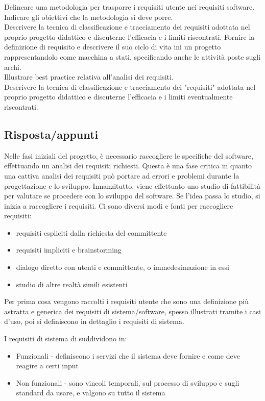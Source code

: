 Delineare una metodologia per trasporre i requisiti utente nei requisiti software. 
Indicare gli obiettivi che la metodologia si deve porre.\\

Descrivere la tecnica di classificazione e tracciamento dei requisiti adottata nel proprio progetto didattico e discuterne l'efficacia e i limiti riscontrati.
Fornire la definizione di requisito e descrivere il suo ciclo di vita ini un progetto rappresentandolo come macchina a stati, specificando anche le attività poste sugli archi.\\

Illustrare best practice relativa all'analisi dei requisiti.\\

Descrivere la tecnica di classificazione e tracciamento dei "requisiti" adottata nel proprio progetto didattico e discuterne l'efficacia e i limiti eventualmente riscontrati.

\subsection*{Risposta/appunti}

Nelle fasi iniziali del progetto, è necessario raccogliere le specifiche del software, effettuando un analisi dei requisiti richiesti. Questa è una fase critica in quanto una cattiva analisi dei requisiti può portare ad errori e problemi durante la progettazione e lo sviluppo.
Innanzitutto, viene effettuato uno studio di fattibilità per valutare se procedere con lo sviluppo del software. Se l'idea passa lo studio, si inizia a raccogliere i requisiti. Ci sono diversi modi e fonti per raccogliere requisiti:
\begin{itemize}
\item requisiti espliciti dalla richiesta del committente
\item requisiti impliciti e brainstorming 
\item dialogo diretto con utenti e committente, o immedesimazione in essi
\item studio di altre realtà simili esistenti
\end{itemize}
Per prima cosa vengono raccolti i requisiti utente che sono una definizione più astratta e generica dei requisiti di sistema/software, spesso illustrati tramite i casi d'uso, poi si definiscono in dettaglio i requisiti di sistema.

I requisiti di sistema di suddividono in:
\begin{itemize}
\item Funzionali - definiscono i servizi che il sistema deve fornire e come deve reagire a certi input
\item Non funzionali - sono vincoli temporali, sul processo di sviluppo e sugli standard da usare, e valgono su tutto il sistema
\end{itemize}

